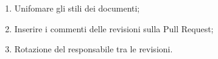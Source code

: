 \begin{enumerate}
    \item Unifomare gli stili dei documenti;
    \item Inserire i commenti delle revisioni sulla Pull Request;
    \item Rotazione del responsabile tra le revisioni.
\end{enumerate}